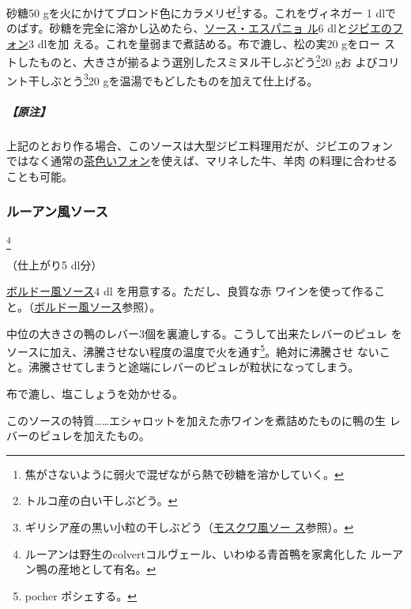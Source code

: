 \begin{recette}
砂糖50 gを火にかけてブロンド色にカラメリゼ\footnote{焦がさないように弱火で混ぜながら熱で砂糖を溶かしていく。}する。これをヴィネガー
1\undemi{}
dlでのばす。砂糖を完全に溶かし込めたら、\protect\hyperlink{sauce-espagnole}{ソース・エスパニョ
ル}6 dlと\protect\hyperlink{fonds-de-gibier}{ジビエのフォン}3 dlを加
える。これを\troisquarts{}量弱まで煮詰める。布で漉し、松の実20 gをロー
ストしたものと、大きさが揃るよう選別したスミヌル干しぶどう\footnote{トルコ産の白い干しぶどう。}20
gお よびコリント干しぶとう\footnote{ギリシア産の黒い小粒の干しぶどう（\protect\hyperlink{sauce-moscovite}{モスクワ風ソー
  ス}参照）。}20 gを温湯でもどしたものを加えて仕上げる。

\hypertarget{ux539fux6ce8-1}{%
\subparagraph{【原注】}\label{ux539fux6ce8-1}}

上記のとおり作る場合、このソースは大型ジビエ料理用だが、ジビエのフォン
ではなく通常の\protect\hyperlink{fonds-brun}{茶色いフォン}を使えば、マリネした牛、羊肉
の料理に合わせることも可能。

\hypertarget{sauce-rouennaise}{%
\subsubsection{ルーアン風ソース}\label{sauce-rouennaise}}

\footnote{ルーアンは野生のcolvertコルヴェール、いわゆる青首鴨を家禽化した
  ルーアン鴨の産地として有名。}


（仕上がり5 dl分）

\protect\hyperlink{sauce-bordelaise}{ボルドー風ソース}4 dl
を用意する。ただし、良質な赤
ワインを使って作ること。（\protect\hyperlink{sauce-bordelaise}{ボルドー風ソース}参照）。

中位の大きさの鴨のレバー3個を裏漉しする。こうして出来たレバーのピュレ
をソースに加え、沸騰させない程度の温度で火を通す\footnote{pocher
  ポシェする。}。絶対に沸騰させ
ないこと。沸騰させてしまうと途端にレバーのピュレが粒状になってしまう。

布で漉し、塩こしょうを効かせる。

このソースの特質\ldots{}\ldots{}エシャロットを加えた赤ワインを煮詰めたものに鴨の生
レバーのピュレを加えたもの。


\end{recette}
